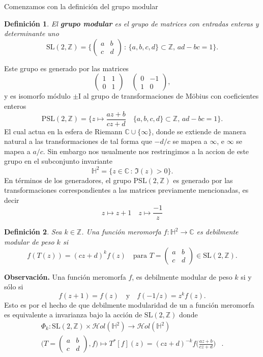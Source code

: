 \documentclass[letterpaper]{article}
\newtheorem{def.}{Definici\'on}[section]
\newcommand{\zah}{\ensuremath{ \mathbb Z }}
\newcommand{\obs}{{\noindent \sc \textbf{Observación. }}}
\newcommand{\co}{\ensuremath{\mathbb C }}
\newcommand{\hol}{\ensuremath{\mathcal{H}ol}}
\newcommand{\pslz}{\ensuremath{\mathrm{PSL}(2,\mathbb Z) }}
\newcommand{\hd}{\ensuremath{\mathbb H^2}}
\newcommand{\slz}{\ensuremath{\mathrm{SL}(2,\mathbb Z) }}
\begin{document}
\noindent Comenzamos con la definición del grupo modular
\begin{def.}
El \textbf{grupo modular} es el grupo de matrices con entradas enteras y determinante uno
\begin{equation}
    \slz=\Big\{ \begin{pmatrix}a & b\\ c & d \end{pmatrix} \,:\,\{a,b,c,d\}\subset\zah,\,ad-bc=1\Big\}.
\end{equation}
\end{def.}
Este grupo es generado por las matrices
\[
    \begin{pmatrix}1 & 1\\ 0 & 1 \end{pmatrix}\quad\begin{pmatrix}0 & -1\\ 1 & 0 \end{pmatrix},
\]
y es isomorfo módulo \(\pm \mathrm{I}\) al grupo de transformaciones de Möbius con coeficientes enteros
\[
    \pslz=\big\{z\mapsto\frac{az+b}{cz+d}\quad\{a,b,c,d\}\subset\zah,\,ad-bc=1\big\}.
\]
El cual actua en la esfera de Riemann \(\co\cup\{\infty\}\), donde se extiende de manera natural a las transformaciones de tal forma que \(-d/c\) se mapea a \(\infty\), e \(\infty\) se mapea a \(a/c\). Sin embargo nos usualmente nos restringimos a la accion de este grupo en el subconjunto invariante
\[
    \hd=\{z\in\co\,:\,\Im(z)>0\}.
\]
En términos de los generadores, el grupo \(\pslz\) es generado por las transformaciones correspondientes a las matrices previamente mencionadas, es decir
\[
    z\mapsto z+1\quad z\mapsto\frac{-1}{z}
\]
\begin{def.}
Sea \(k\in\zah\). Una función meromorfa \(f:\hd\rightarrow\co\) es debilmente modular de peso \(k\) si
\[
    f(T(z))=(cz+d)^{k}f(z)\quad\text{para } T=\begin{pmatrix}a & b\\ c & d \end{pmatrix}\in\slz.
\]
\end{def.}
\obs Una función meromorfa \(f\), es debilmente modular de peso \(k\) si y sólo si
\[
    f(z+1)=f(z)\quad\text{y}\quad f(-1/z)=z^{k}f(z).
\]
Esto es por el hecho de que debilmente modularidad de un a función meromorfa es equivalente a invarianza bajo la acción de \(\slz\) donde
\begin{align*}\label{mod-acc}
        \Phi_k:\slz\times\hol(\hd)\rightarrow\hol(\hd)\\
        \Big(T=\begin{pmatrix}a & b\\ c & d \end{pmatrix},f\Big)\mapsto T^{*}[f](z)=(cz+d)^{-k}f\Big(\frac{az+b}{cz+d}\Big)&.
\end{align*}
\end{document}
